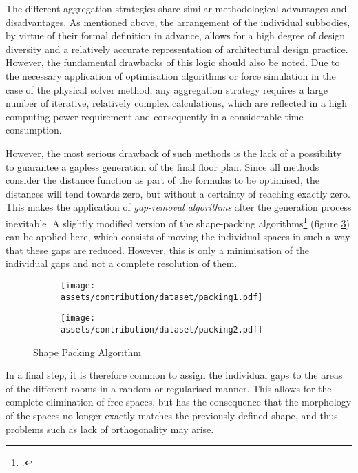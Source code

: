 \documentclass[a4paper, 12pt]{report}
\begin{document}
The different aggregation strategies share similar methodological advantages and disadvantages. As mentioned above, the arrangement of the individual subbodies, by virtue of their formal definition in advance, allows for a high degree of design diversity and a relatively accurate representation of architectural design practice. However, the fundamental drawbacks of this logic should also be noted. Due to the necessary application of optimisation algorithms or force simulation in the case of the physical solver method, any aggregation strategy requires a large number of iterative, relatively complex calculations, which are reflected in a high computing power requirement and consequently in a considerable time consumption.

However, the most serious drawback of such methods is the lack of a possibility to guarantee a gapless generation of the final floor plan. Since all methods consider the distance function as part of the formulas to be optimised, the distances will tend towards zero, but without a certainty of reaching exactly zero. This makes the application of \textit{gap-removal algorithms} after the generation process inevitable. A slightly modified version of the shape-packing algorithms\footcite{jabi2013potential} (figure \ref{fig:shape-packing-algorithm-results}) can be applied here, which consists of moving the individual spaces in such a way that these gaps are reduced. However, this is only a minimisation of the individual gaps and not a complete resolution of them.

\begin{figure}
\centering
\begin{subfigure}{.5\textwidth}
\centering
\texttt{[image: assets/contribution/dataset/packing1.pdf]}
\label{fig:shape-packing-1}
\end{subfigure}%
\begin{subfigure}{.5\textwidth}
\centering
\texttt{[image: assets/contribution/dataset/packing2.pdf]}
\label{fig:shape-packing-2}
\end{subfigure}
\caption{Shape Packing Algorithm}
\label{fig:shape-packing-algorithm-results}
\end{figure}

In a final step, it is therefore common to assign the individual gaps to the areas of the different rooms in a random or regularised manner. This allows for the complete elimination of free spaces, but has the consequence that the morphology of the spaces no longer exactly matches the previously defined shape, and thus problems such as lack of orthogonality may arise.
\end{document}
